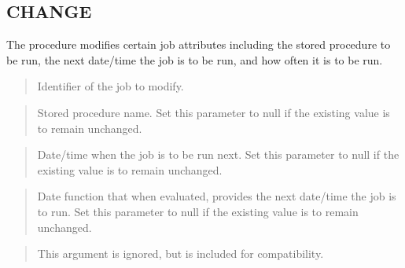 \documentclass[letterpaper,10pt,english,openany,oneside]{sphinxmanual}
\begin{document}
\newpage


\subsection{CHANGE}
\label{\detokenize{change:change}}\label{\detokenize{change::doc}}
The  procedure modifies certain job attributes including the
stored procedure to be run, the next date/time the job is to be run, and
how often it is to be run.

\begin{quote}

\end{quote}


\begin{quote}

Identifier of the job to modify.
\end{quote}

\begin{quote}

Stored procedure name. Set this parameter to null if the existing value
is to remain unchanged.
\end{quote}

\begin{quote}

Date/time when the job is to be run next. Set this parameter to null if
the existing value is to remain unchanged.
\end{quote}

\begin{quote}

Date function that when evaluated, provides the next date/time the job
is to run. Set this parameter to null if the existing value is to remain
unchanged.
\end{quote}

\begin{quote}

This argument is ignored, but is included for compatibility.
\end{quote}
\end{document}
